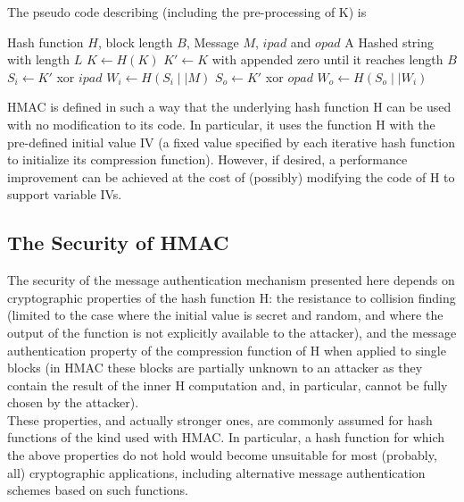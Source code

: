 \documentclass[12pt,a4paper,oneside]{report}
\begin{document}
The pseudo code describing (including the pre-processing of K) is
\begin{algorithm}
    \begin{algorithmic}
        \Require Hash function $H$, block length $B$, Message $M$, $ipad$ and $opad$
        \Ensure A Hashed string with length $L$
                \State $K \gets H(K)$ 
            \EndIf
            \State $K' \gets K$ with appended zero until it reaches length $B$
            \State $S_i \gets K'$ xor $ipad$
            \State $W_i \gets H(S_i \mid\mid M)$
            \State $S_o \gets K'$ xor $opad$
            \State $W_o \gets H(S_o \mid\mid W_i)$
            \State {}
        \EndFunction  
    \end{algorithmic}  
\end{algorithm}

HMAC is defined in such a way that the underlying hash function H can
   be used with no modification to its code. In particular, it uses the
   function H with the pre-defined initial value IV (a fixed value
   specified by each iterative hash function to initialize its
   compression function).  However, if desired, a performance
   improvement can be achieved at the cost of (possibly) modifying the
   code of H to support variable IVs.\\

\subsection{The Security of HMAC}

The security of the message authentication mechanism presented here
   depends on cryptographic properties of the hash function H: the
   resistance to collision finding (limited to the case where the
   initial value is secret and random, and where the output of the
   function is not explicitly available to the attacker), and the
   message authentication property of the compression function of H when
   applied to single blocks (in HMAC these blocks are partially unknown
   to an attacker as they contain the result of the inner H computation
   and, in particular, cannot be fully chosen by the attacker).\\

These properties, and actually stronger ones, are commonly assumed
   for hash functions of the kind used with HMAC. In particular, a hash
   function for which the above properties do not hold would become
   unsuitable for most (probably, all) cryptographic applications,
   including alternative message authentication schemes based on such
   functions.\\
\end{document}
